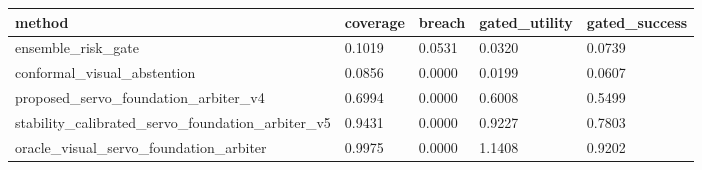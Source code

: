 \begin{tabular}{lllll}
\toprule
method & coverage & breach & gated\_utility & gated\_success \\
\midrule
ensemble\_risk\_gate & 0.1019 & 0.0531 & 0.0320 & 0.0739 \\
conformal\_visual\_abstention & 0.0856 & 0.0000 & 0.0199 & 0.0607 \\
proposed\_servo\_foundation\_arbiter\_v4 & 0.6994 & 0.0000 & 0.6008 & 0.5499 \\
stability\_calibrated\_servo\_foundation\_arbiter\_v5 & 0.9431 & 0.0000 & 0.9227 & 0.7803 \\
oracle\_visual\_servo\_foundation\_arbiter & 0.9975 & 0.0000 & 1.1408 & 0.9202 \\
\bottomrule
\end{tabular}
